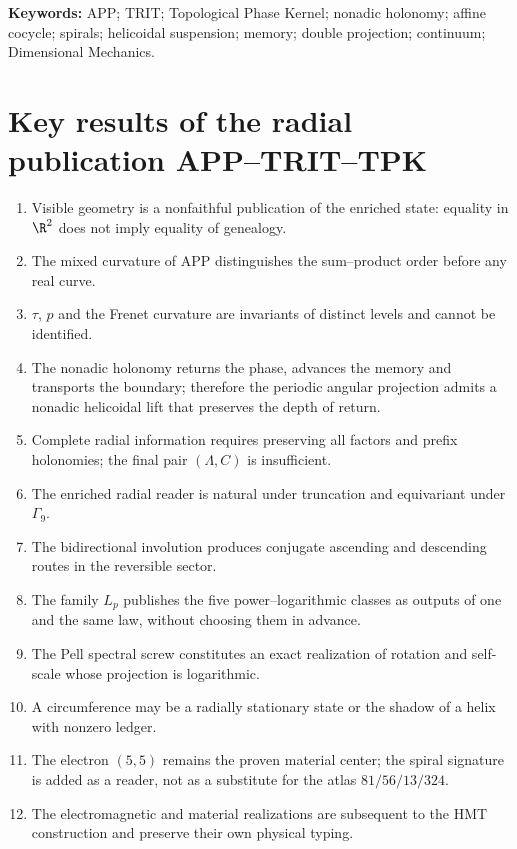 \bigskip
\noindent\textbf{Keywords:} APP; TRIT; Topological Phase Kernel;
nonadic holonomy; affine cocycle; spirals; helicoidal suspension; memory;
double projection; continuum; Dimensional Mechanics.

\part{Key results of the radial publication APP--TRIT--TPK}
\begin{enumerate}[label=\textbf{R\arabic*.},leftmargin=12mm]
\item Visible geometry is a nonfaithful publication of the enriched state:
equality in \(\R^2\) does not imply equality of genealogy.
\item The mixed curvature of APP distinguishes the sum--product order before
any real curve.
\item \(\tau\), \(p\) and the Frenet curvature are invariants of distinct levels
and cannot be identified.
\item The nonadic holonomy returns the phase, advances the memory and transports
the boundary; therefore the periodic angular projection admits a nonadic
helicoidal lift that preserves the depth of return.
\item Complete radial information requires preserving all factors and prefix holonomies; the final pair \((\Lambda,C)\) is insufficient.
\item The enriched radial reader is natural under truncation and
equivariant under \(\Gamma_9\).
\item The bidirectional involution produces conjugate ascending and descending routes in the reversible sector.
\item The family \(L_p\) publishes the five power--logarithmic classes as
outputs of one and the same law, without choosing them in advance.
\item The Pell spectral screw constitutes an exact realization of
rotation and self-scale whose projection is logarithmic.
\item A circumference may be a radially stationary state or the
shadow of a helix with nonzero ledger.
\item The electron \((5,5)\) remains the proven material center; the
spiral signature is added as a reader, not as a substitute for the atlas
\(81/56/13/324\).
\item The electromagnetic and material realizations are subsequent to the
HMT construction and preserve their own physical typing.
\end{enumerate}

